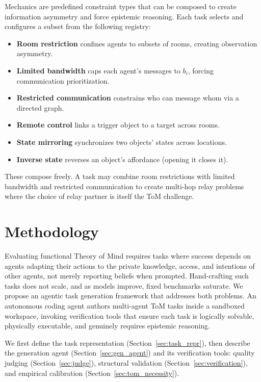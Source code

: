 \documentclass{article} %
\begin{document}
Mechanics are predefined constraint types that can be composed to create information asymmetry and force epistemic reasoning. Each task selects and configures a subset from the following registry:
\begin{itemize}
  \item \textbf{Room restriction} confines agents to subsets of rooms, creating observation asymmetry.
  \item \textbf{Limited bandwidth} caps each agent's messages to $b_i$, forcing communication prioritization.
  \item \textbf{Restricted communication} constrains who can message whom via a directed graph.
  \item \textbf{Remote control} links a trigger object to a target across rooms.
  \item \textbf{State mirroring} synchronizes two objects' states across locations.
  \item \textbf{Inverse state} reverses an object's affordance (opening it closes it).
\end{itemize}
These compose freely. A task may combine room restrictions with limited bandwidth and restricted communication to create multi-hop relay problems where the choice of relay partner is itself the ToM challenge.


\section{Methodology}
\label{sec:methodology}

Evaluating functional Theory of Mind requires tasks where success depends on agents adapting their actions to the private knowledge, access, and intentions of other agents, not merely reporting beliefs when prompted. Hand-crafting such tasks does not scale, and as models improve, fixed benchmarks saturate. We propose an agentic task generation framework that addresses both problems. An autonomous coding agent authors multi-agent ToM tasks inside a sandboxed workspace, invoking verification tools that ensure each task is logically solvable, physically executable, and genuinely requires epistemic reasoning.

We first define the task representation (Section~\ref{sec:task_repr}), then describe the generation agent (Section~\ref{sec:gen_agent}) and its verification tools: quality judging (Section~\ref{sec:judge}), structural validation (Section~\ref{sec:verification}), and empirical calibration (Section~\ref{sec:tom_necessity}).
\end{document}
